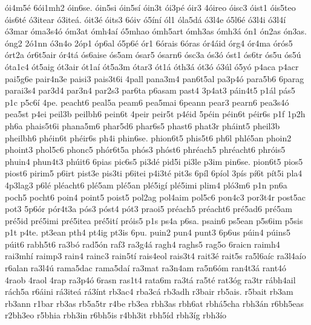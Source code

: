 {^^f3i4m5^^e9
6^^f3i1mh2
^^f3in6se.
^^f3in5si
^^f3in5s^^ed
^^f3in3t
^^f3i3p^^e9
^^f3ir3
4^^f3ireo
^^f3isc3
^^f3ist1
^^f3is5teo
^^f3is6t^^e9
^^f33itear
^^f33ite^^e1.
^^f3it3^^e9
^^f3its3
6^^f3iv
^^f35^^edn^^ed
^^f3l1
^^f3la5d^^e1
^^f33l4e
^^f35l6^^e9
^^f33l4i
^^f33l4^^ed
^^f33mar
^^f3ma3s4^^f3
^^f3m3at
^^f3mh4a^^ed
^^f35mhao
^^f3mh5art
^^f3mh3as
^^f3mh3^^e1
^^f3n1
^^f3n2as
^^f3n3as.
^^f3ng2
2^^f31nn
^^f33n4o
2^^f3p1
^^f3p6al
^^f35p6^^e9
^^f3r1
6^^f3rais
6^^f3ras
^^f3r4^^e1id
^^f3rg4
^^f3r4ma
^^f3r^^f3s5
^^f3rt2a
^^f3r6t5air
^^f3r4t^^e1
^^f3s6aise
^^f3s5am
^^f3sar5
^^f3sarn6
^^f3sc3a
^^f3s3^^f3
^^f3st1
^^f3s6tr
^^f3s5u
^^f3s5^^fa
^^f3ta1c4
^^f3t5aig
^^f3t3air
^^f3t1a^^ed
^^f3t5a3m
^^f3tar3
^^f3t1^^e1
^^f3th3^^e1
^^f3t3^^f3
^^f33^^fal
^^f35y^^f3
p4aca
p4acr
pai5g6e
pair4n3e
paisi3
pais3t6i
4pall
pana3m4
pan6t5al
pa3p4^^f3
para5b6
6parag
parai3s4
par3d4
par3n4
par2s3
par6ta
p6asam
past4
3p4at3
p^^e1in4t5
p1^^e1l
p^^e1s5
p1c
p5c6^^ed
4pe.
peacht6
peal5a
peam6
pea5mai
6peann
pear3
pearn6
pea3s4^^f3
pea5st
p4ei
peil3b
peilbh6
pein6t
4peir
peir5t
p4^^e9id
5p^^e9in
p^^e9in6t
p^^e9ir6s
p1f
1p2h
ph6a
phais5t6i
phana5m6
phar5d6
phar6s5
phast6
phat3r
ph^^e1int5
pheil3b
pheilbh6
ph^^e9in6t
ph^^e9ir6s
ph4i
phin6se.
phion6t5
phis5t6
ph6l
phl^^e95an
phoin2
phoint3
phol5c6
phonc5
ph^^f3r6t5a
ph^^f3s3
ph^^f3st6
phr^^e9ach5
phr^^e9acht6
phr^^f3is5
phuin4
phun4t3
ph^^fait6
6pias
pic6s5
pi3d^^e9
pid5i
pi3le
p3im
pin6se.
pion6t5
pios5
piost6
pirim5
p6irt
pist3e
pis3ti
p6itei
p4i3t^^e9
pit3s
6p^^edl
6p^^edol
3p^^eds
p^^ed6t
p^^edt5i
pla4
4p3lag3
p6l^^e9
pl^^e9acht6
pl^^e95am
pl^^e95an
pl^^e95ig^^ed
pl^^e95imi
plim4
pl^^f33m6
p1n
pn6a
poch5
pocht6
poin4
point5
poist5
pol2ag
pol4aim
pol5c6
pon4c3
por3t4r
post5ac
pot3
5p6^^f3r
p^^f3r4t3a
p^^f3s3
p^^f3st4
p^^f3t3
praoi5
pr^^e9ach5
pr^^e9acht6
pr^^e95ad6
pr^^e95am
pr^^e95id
pr^^e95imi
pr^^e95itea
pr^^e95it^^ed
pr^^f3is5
p1s
ps4a
p6sa.
psain6
ps5ean
p5s6im
p5sis
p1t
p4te.
pt3ean
pth4
pt4ig
pt3is
6pu.
puin2
pun4
punt3
6p6us
p^^fain4
p^^fains5
p^^fait6
rabh5t6
ra3b^^f3
rad5^^f3n
raf3
ra3g4^^e1
ragh4
raghs5
rag5o
6raicn
raimh4
rai3mh^^ed
raimp3
rain4
rainc3
rain5t^^ed
rais4eol
rais3t4
rait3^^e9
rait5s
ra5l6a^^edc
ra3l4a^^edo
r6alan
ra3l4^^fa
rama5dac
rama5da^^ed
ra3mat
ra3n4am
ra5n6^^f3m
ran4t3^^e1
rant4^^f3
4raob
4raol
4rap
ra3p4^^f3
6rasn
ras1t4
rata6m
ra3t^^e1
ra5t^^e9
rat3^^f3g
ra3tr
r^^e1bh4ail
r^^e1ch5a
r6^^e1ini
r^^e13ite^^e1
r^^e13^^ednt
rb3ac4
rba3c^^e1
rb3adh
r3bair
rb5ais.
r5bait
rb3am
rb3ann
r1bar
rb3as
rb5a5tr
r4be
rb3ea
rbh3as
rbh6at
rbh^^e15cha
rbh3^^e1n
r6bh5eas
r2bh3eo
r5bhia
rbh3in
r6bh5is
r4bh3it
rbh5^^edd
rbh3^^edg
rbh3^^edo
}
